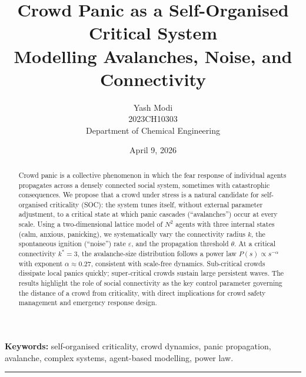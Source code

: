 \documentclass[12pt, a4paper]{article}
\begin{document}
\title{
\Large \textbf{Crowd Panic as a Self-Organised Critical System} \\
\vspace{0.5em}
\large Modelling Avalanches, Noise, and Connectivity
}
\vspace{-3em}
\author{
\large Yash Modi \\
\normalsize 2023CH10303 \\
\normalsize Department of Chemical Engineering
}
\vspace{-1.5em}
\date{\small April 9, 2026}

\maketitle

\vspace{-2em}
\begin{abstract}
\noindent
Crowd panic is a collective phenomenon in which the fear response of individual agents propagates across a densely connected social system, sometimes with
catastrophic consequences.  We propose that a crowd under stress is a natural
candidate for self-organised criticality (SOC): the system tunes itself, without
external parameter adjustment, to a critical state at which panic cascades
(``avalanches'') occur at every scale.  Using a two-dimensional lattice model of
$N^2$ agents with three internal states (calm, anxious, panicking), we
systematically vary the connectivity radius $k$, the spontaneous ignition
(``noise'') rate $\varepsilon$, and the propagation threshold $\theta$.  At a
critical connectivity $k^* = 3$, the avalanche-size distribution follows a
power law $P(s)\propto s^{-\alpha}$ with exponent $\alpha\approx 0.27$,
consistent with scale-free dynamics.  Sub-critical crowds dissipate local panics
quickly; super-critical crowds sustain large persistent waves.  The results
highlight the role of social connectivity as the key control parameter governing
the distance of a crowd from criticality, with direct implications for crowd
safety management and emergency response design.
\end{abstract}

\noindent\textbf{Keywords:} self-organised criticality, crowd dynamics, panic
propagation, avalanche, complex systems, agent-based modelling, power law.

\vspace{1em}\hrule\vspace{1em}
\end{document}
